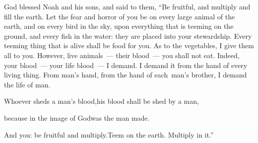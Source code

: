 
\begin{inparaenum}
   God blessed Noah and his sons, and said to them, ``Be fruitful, and multiply and fill the earth.%
   Let the fear and horror of you be on every large animal of the earth, and on every bird in the sky, upon everything that is teeming on the ground, and every fish in the water: they are placed into your stewardship.%
   Every teeming thing that is alive shall be food for you. As to the vegetables, I give them all to you.%
   However, live animals~--- their blood~--- you shall not eat.%
   Indeed, your blood~--- your life blood\understood{}~--- I demand. I demand it from the hand of every living thing. From man's hand, from the hand of each\understood{}\ man's brother, I demand the life of man.%

  \pc{} Whoever sheds a man's blood,\pa{}his blood shall be shed by a man,%

  \pc{}because in the image of God\pa{}was the man made.%

  \pc{} And you: be fruitful and multiply.\pa{}Teem on the earth. Multiply in it.''%


\end{inparaenum}
